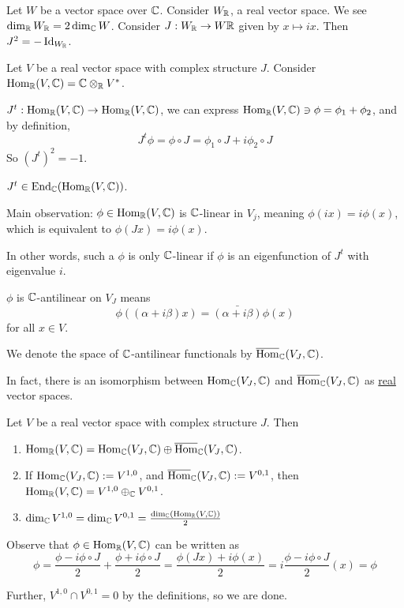\documentclass[x11names,reqno,14pt]{extarticle}
\begin{document}
Let $W$ be a vector space over $\mathbb{C}$. Consider $W_{\mathbb{R}}$, a real vector space. We see $\dim_{\mathbb{R}}W_{\mathbb{R}} = 2\dim_{\mathbb{C}}W$. Consider $J:W_{\mathbb{R}}\to W\mathbb{R}$ given by $x \mapsto ix$. Then $J^2 = -\operatorname{\mathrm{Id}}_{W_{\mathbb{R}}}$. 

Let $V$ be a real vector space with complex structure $J$. Consider ${\mathrm{Hom}}_{\mathbb{R}}(V, \mathbb{C}) =\mathbb{C}\otimes_{\mathbb{R}} V^*$. 

$J^t: {\mathrm{Hom}}_{\mathbb{R}}(V, \mathbb{C})\to{\mathrm{Hom}}_{\mathbb{R}}(V, \mathbb{C})$, we can express ${\mathrm{Hom}}_{\mathbb{R}}(V,\mathbb{C}) \ni \phi = \phi_1 + \phi_2$, and by definition, 
\[
J^t \phi = \phi \circ J = \phi_1 \circ J + i\phi_2 \circ J
\]
So $(J^t)^2 = -1$. 

$J^t \in {\mathrm{End}}_{\mathbb{C}}({\mathrm{Hom}}_{\mathbb{R}}(V, \mathbb{C}))$. 

Main observation: $\phi \in {\mathrm{Hom}}_{\mathbb{R}}(V, \mathbb{C})$ is $\mathbb{C}$-linear in $V_j$, meaning $\phi(ix) = i\phi(x)$, which is equivalent to $\phi(Jx) = i\phi(x)$. 

In other words, such a $\phi$ is only $\mathbb{C}$-linear if $\phi$ is an eigenfunction of $J^t$ with eigenvalue $i$. 

 $\phi$ is $\mathbb{C}$-antilinear on $V_J$ means 
\[
\phi((\alpha + i\beta)x) = \bar{(\alpha + i\beta)}\phi(x)
\]
for all $x \in V$. 

We denote the space of $\mathbb{C}$-antilinear functionals by $\overline{{\mathrm{Hom}}}_{\mathbb{C}}(V_J,\mathbb{C})$. 

In fact, there is an isomorphism between ${\mathrm{Hom}}_{\mathbb{C}}(V_J,\mathbb{C})$ and $\overline{{\mathrm{Hom}}}_{\mathbb{C}}(V_J, \mathbb{C})$ as \underline{real} vector spaces. 

\thm 

Let $V$ be a real vector space with complex structure $J$. Then
\begin{enumerate}
\item ${\mathrm{Hom}}_{\mathbb{R}}(V, \mathbb{C}) = {\mathrm{Hom}}_{\mathbb{C}}(V_J, \mathbb{C})\oplus\overline{{\mathrm{Hom}}}_{\mathbb{C}}(V_J, \mathbb{C})$. 
\item If ${\mathrm{Hom}}_{\mathbb{C}}(V_J, \mathbb{C}) := V^{1, 0}$, and $\overline{{\mathrm{Hom}}}_{\mathbb{C}}(V_J, \mathbb{C}) := V^{0, 1}$, then ${\mathrm{Hom}}_{\mathbb{R}}(V,\mathbb{C}) = V^{1, 0} \oplus_{\mathbb{C}}V^{0, 1}$. 
\item $\dim_{\mathbb{C}}V^{1, 0} = \dim_{\mathbb{C}}V^{0, 1} = \frac{\dim_{\mathbb{C}}({\mathrm{Hom}}_{\mathbb{R}}(V, \mathbb{C}))}{2}$
\end{enumerate}

\proof

Observe that $\phi \in {\mathrm{Hom}}_{\mathbb{R}}(V, \mathbb{C})$ can be written as 
\[
\phi = \frac{\phi -i\phi\circ J}{2} + \frac{\phi + i\phi\circ J}{2} = \frac{\phi(Jx) + i\phi(x)}{2} = i\frac{\phi - i\phi\circ J}{2}(x) = \phi
\]

Further, $V^{1, 0} \cap V^{0, 1} = 0$ by the definitions, so we are done. 
\end{document}

